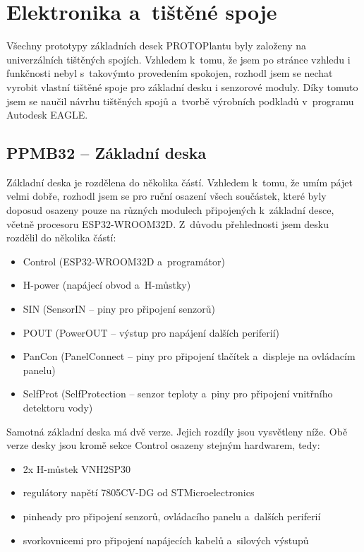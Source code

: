 \chapter{Elektronika a~tištěné spoje}
Všechny prototypy základních desek PROTOPlantu byly založeny na univerzálních tištěných spojích. Vzhledem k~tomu, že jsem po stránce vzhledu i funkčnosti nebyl s~takovýmto provedením spokojen, rozhodl jsem se nechat vyrobit vlastní tištěné spoje pro základní desku i senzorové moduly.
Díky tomuto jsem se naučil návrhu tištěných spojů a~tvorbě výrobních podkladů v~programu Autodesk EAGLE.

\section{PPMB32 -- Základní deska}
\label{subsec:motherBoard}
Základní deska je rozdělena do několika částí. 
Vzhledem k~tomu, že umím pájet velmi dobře, rozhodl jsem se pro ruční osazení všech součástek, které byly doposud osazeny pouze na různých modulech připojených k~základní desce, včetně procesoru ESP32-WROOM32D.
Z~důvodu přehlednosti jsem desku rozdělil do několika částí:

\begin{itemize}
    \item Control (ESP32-WROOM32D a~programátor)
    \item H-power (napájecí obvod a~H-můstky)
    \item SIN (SensorIN -- piny pro připojení senzorů)
    \item POUT (PowerOUT -- výstup pro napájení dalších periferií)
    \item PanCon (PanelConnect -- piny pro připojení tlačítek a~displeje na ovládacím panelu)
    \item SelfProt (SelfProtection -- senzor teploty a~piny pro připojení vnitřního detektoru vody)
\end{itemize} 

Samotná základní deska má dvě verze. Jejich rozdíly jsou vysvětleny níže.
Obě verze desky jsou kromě sekce Control osazeny stejným hardwarem, tedy:

\begin{itemize}
    \item 2x H-můstek VNH2SP30
    \item regulátory napětí 7805CV-DG od STMicroelectronics
    \item pinheady pro připojení senzorů, ovládacího panelu a~dalších periferií
    \item svorkovnicemi pro připojení napájecích kabelů a~silových výstupů
\end{itemize}

